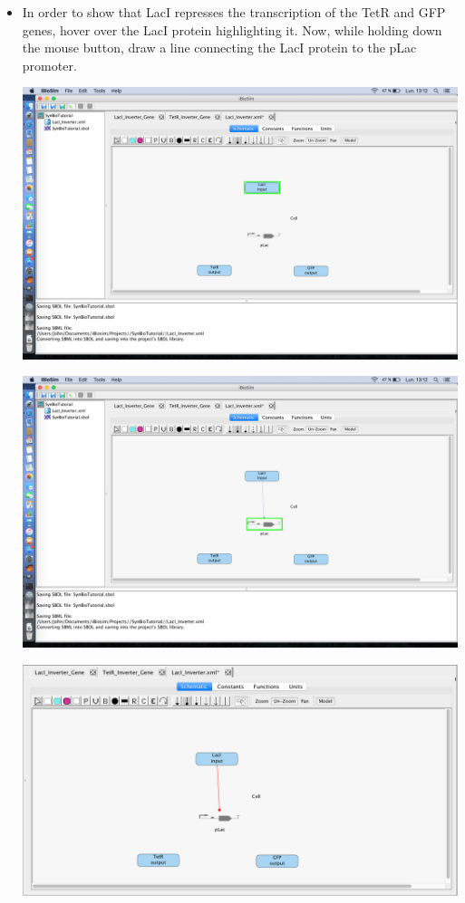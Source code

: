 \documentclass[titlepage,11pt]{article}
\begin{document}
\begin{itemize}
\item In order to show that LacI represses the transcription of the TetR and GFP genes, hover over the LacI protein highlighting it. Now, while holding down the mouse button, draw a line connecting the LacI protein to the pLac promoter.

\begin{center}
\includegraphics[width=160mm]{"screenshots/Repression Arc Beginning"}
\end{center}

\begin{center}
\includegraphics[width=160mm]{"screenshots/Repression Arc Target"}
\end{center}

\begin{center}
\includegraphics[width=160mm]{"screenshots/Repression Arc Complete"}
\end{center}


\end{itemize}
\end{document}
